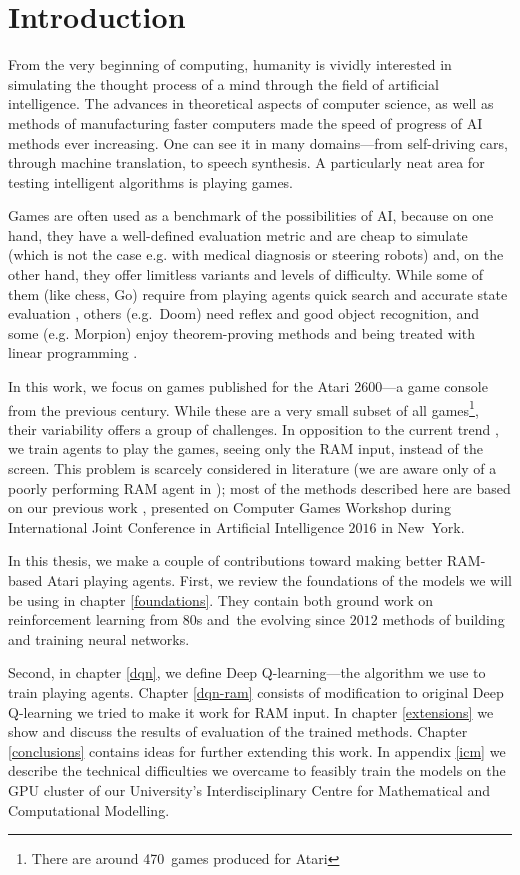 \chapter*{Introduction}
From the very beginning of computing, humanity is vividly interested in simulating the thought process of a mind through the field of artificial intelligence. The advances in theoretical aspects of computer science, as well as methods of manufacturing faster computers made the speed of progress of AI methods ever increasing. One can see it in many domains---from self-driving cars, through machine translation, to speech synthesis. A particularly neat area for testing intelligent algorithms is playing games.

Games are often used as a benchmark of the possibilities of AI, because on one hand, they have a well-defined evaluation metric and are cheap to simulate (which is not the case e.g. with medical diagnosis or steering robots) and, on the other hand, they offer limitless variants and levels of difficulty. While some of them (like chess, Go) require from playing agents quick search and accurate state evaluation \cite{alphago}, others (e.g.~Doom) need reflex and good object recognition, and some (e.g. Morpion) enjoy theorem-proving methods and being treated with linear programming \cite{morpion}.

In this work, we focus on games published for the Atari 2600---a game console from the previous century. While these are a very small subset of all games\footnote{There are around 470~games produced for Atari}, their variability offers a group of challenges. In opposition to the current trend \cite{nips-dqn, nature-dqn, a3c}, we train agents to play the games, seeing only the RAM input, instead of the screen. This problem is scarcely considered in literature (we are aware only of a poorly performing RAM agent in \cite{ale}); most of the methods described here are based on our previous work \cite{our-paper}, presented on Computer Games Workshop during International Joint Conference in Artificial Intelligence $2016$ in New~York.

In this thesis, we make a couple of contributions toward making better RAM-based Atari playing agents. First, we review the foundations of the models we will be using in chapter \ref{foundations}. They contain both ground work on reinforcement learning from 80s and~the evolving since $2012$ methods of building and training neural networks.

Second, in chapter \ref{dqn}, we define Deep Q-learning---the algorithm we use to train playing agents.
Chapter \ref{dqn-ram} consists of modification to original Deep Q-learning we tried to make it work for RAM input.
In chapter \ref{extensions} we show and discuss the results of evaluation of the trained methods.
Chapter \ref{conclusions} contains ideas for further extending this work.
In appendix \ref{icm} we describe the technical difficulties we overcame to feasibly train the models on the GPU cluster of our University's Interdisciplinary Centre for Mathematical and Computational Modelling.
\iffalse
\section*{Acknowledgements}
\addcontentsline{toc}{section}{Acknowledgements}
First of all, I would like to thank dr~hab. Henryk~Michalewski 
\fi
{}
